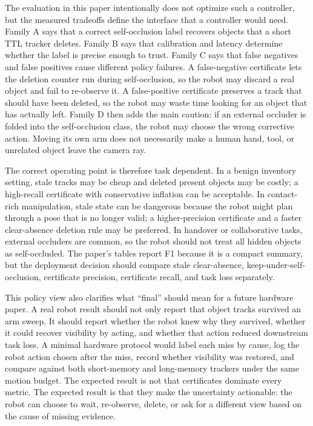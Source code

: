 \documentclass{article}
\begin{document}
The evaluation in this paper intentionally does not optimize such a controller,
but the measured tradeoffs define the interface that a controller would need.
Family A says that a correct self-occlusion label recovers objects that a short
TTL tracker deletes. Family B says that calibration and latency determine whether
the label is precise enough to trust. Family C says that false negatives and
false positives cause different policy failures. A false-negative certificate
lets the deletion counter run during self-occlusion, so the robot may discard a
real object and fail to re-observe it. A false-positive certificate preserves a
track that should have been deleted, so the robot may waste time looking for an
object that has actually left. Family D then adds the main caution: if an
external occluder is folded into the self-occlusion class, the robot may choose
the wrong corrective action. Moving its own arm does not necessarily make a
human hand, tool, or unrelated object leave the camera ray.

The correct operating point is therefore task dependent. In a benign inventory
setting, stale tracks may be cheap and deleted present objects may be costly; a
high-recall certificate with conservative inflation can be acceptable. In
contact-rich manipulation, stale state can be dangerous because the robot might
plan through a pose that is no longer valid; a higher-precision certificate and
a faster clear-absence deletion rule may be preferred. In handover or
collaborative tasks, external occluders are common, so the robot should not treat
all hidden objects as self-occluded. The paper's tables report F1 because it is
a compact summary, but the deployment decision should compare stale
clear-absence, keep-under-self-occlusion, certificate precision, certificate
recall, and task loss separately.

This policy view also clarifies what ``final'' should mean for a future hardware
paper. A real robot result should not only report that object tracks survived an
arm sweep. It should report whether the robot knew why they survived, whether it
could recover visibility by acting, and whether that action reduced downstream
task loss. A minimal hardware protocol would label each miss by cause, log the
robot action chosen after the miss, record whether visibility was restored, and
compare against both short-memory and long-memory trackers under the same
motion budget. The expected result is not that certificates dominate every
metric. The expected result is that they make the uncertainty actionable: the
robot can choose to wait, re-observe, delete, or ask for a different view based
on the cause of missing evidence.
\end{document}
